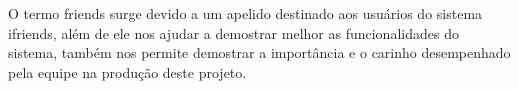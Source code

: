 O termo \glspl{friend} surge devido a um apelido destinado aos usuários do sistema \gls{ifriends}, além de ele nos ajudar a demostrar melhor as funcionalidades do sistema, também nos permite demostrar a importância e o carinho desempenhado pela equipe na produção deste projeto.  













